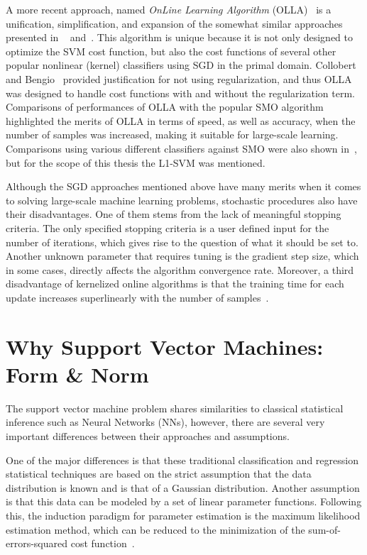 \documentclass[reqno]{vcuthesis}
\numberwithin{equation}{chapter}
\begin{document}
A more recent approach, named \textit{OnLine Learning Algorithm} (OLLA)~\cite{kecman2016fast} is a unification, simplification, and expansion of the somewhat similar approaches presented in
~\cite{herbrich2016learning,kivinen2002large,Schoelkopf2002,Shalev2014,shalev2011pegasos} and~\cite{kecman2016ieee,Melki2016,melki2016fast}. This algorithm is unique because it is not only designed to optimize the SVM cost function, but also the cost functions of several other popular nonlinear (kernel) classifiers using SGD in the primal domain. Collobert and Bengio~\cite{collobert2004links} provided justification for not using regularization, and thus OLLA was designed to handle cost functions with and without the regularization term. Comparisons of performances of OLLA with the popular SMO algorithm highlighted the merits of OLLA in terms of speed, as well as accuracy, when the number of samples was increased, making it suitable for large-scale learning. Comparisons using various different classifiers against SMO were also shown in~\cite{kecman2016fast}, but for the scope of this thesis the L1-SVM was mentioned.

Although the SGD approaches mentioned above have many merits when it comes to solving large-scale machine learning problems, stochastic procedures also have their disadvantages. One of them stems from the lack of meaningful stopping criteria. The only specified stopping criteria is a user defined input for the number of iterations, which gives rise to the question of what it should be set to. Another unknown parameter that requires tuning is the gradient step size, which in some cases, directly affects the algorithm convergence rate. Moreover, a third disadvantage of kernelized online algorithms is that the training time for each update increases superlinearly with the number of samples~\cite{bottou2004large}.

\section{Why Support Vector Machines: Form \& Norm}
The support vector machine problem shares similarities to classical statistical inference such as Neural Networks (NNs), however, there are several very important differences between their approaches and assumptions. 

One of the major differences is that these traditional classification and regression statistical techniques are based on the strict assumption that the data distribution is known and is that of a Gaussian distribution. Another assumption is that this data can be modeled by a set of linear parameter functions. Following this, the induction paradigm for parameter estimation is the maximum likelihood estimation method, which can be reduced to the minimization of the sum-of-errors-squared cost function~\cite{Kecman2001}. 
\end{document}

